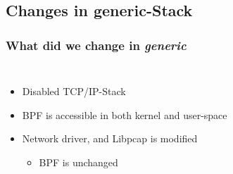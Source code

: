 \documentclass{beamer}
\begin{document}
\subsection*{Changes in generic-Stack}
\begin{frame}
	\frametitle{What did we change in \emph{generic}}
\begin{columns}
\begin{itemize}
	\item <2->Disabled TCP/IP-Stack\newline
	\item <3->BPF is accessible in both kernel and user-space\newline
	\item <4->Network driver, and Libpcap is modified
		\begin{itemize}
			\item BPF is unchanged
		\end{itemize}
\end{itemize}
\vspace{-2em}

\end{columns}
\end{frame}
\end{document}
